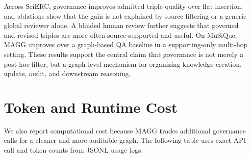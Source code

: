 \documentclass{article}
\newcommand{\system}{\textsc{MAGG}}
\begin{document}

Across SciERC, governance improves admitted triple quality over flat insertion, and ablations show that the gain is not explained by source filtering or a generic global reviewer alone. A blinded human review further suggests that governed and revised triples are more often source-supported and useful. On MuSiQue, MAGG improves over a graph-based QA baseline in a supporting-only multi-hop setting. These results support the central claim that governance is not merely a post-hoc filter, but a graph-level mechanism for organizing knowledge creation, update, audit, and downstream reasoning.

\newpage




\newpage
\appendix

\section{Token and Runtime Cost}
\label{app:cost}

We also report computational cost because \system{} trades additional governance calls for a cleaner and more auditable graph. The following table uses exact API call and token counts from JSONL usage logs.

\begin{table}[h]
\centering
\scriptsize
\caption{LLM Call and Token Cost}
\label{tab:cost}
\end{table}
\end{document}
